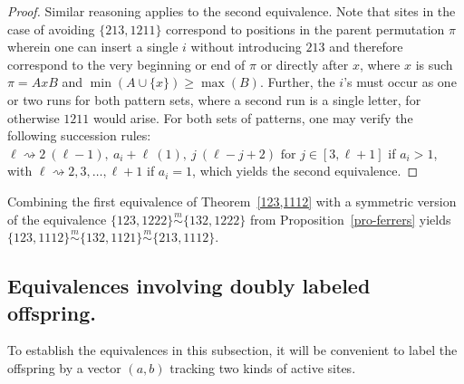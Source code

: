 \documentclass[11pt]{amsart}
\theoremstyle{plain}
\theoremstyle{definition}
\newcommand{\msim}{\stackrel{m}{\sim}}
\begin{document}
\begin{proof}
Similar reasoning applies to the second equivalence.  Note that sites in the case of avoiding
$\{213,1211\}$ correspond to positions  in the parent permutation $\pi$ wherein one can insert a
single $i$ without introducing $213$ and therefore correspond to the very beginning or end of $\pi$
or directly after $x$, where $x$ is such $\pi=AxB$ and $\min(A\cup\{x\}) \geq \max(B)$.  Further, the
$i$'s must occur as one or two runs for both pattern sets, where a second run is a single letter, for
otherwise $1211$ would arise.  For both sets of patterns, one may verify the following succession
rules:  $\ell \rightsquigarrow 2~(\ell-1),~a_i+\ell~(1),~j~(\ell-j+2) \text{ for } j \in [3,\ell+1]$
if $a_i>1$, with $\ell\rightsquigarrow 2,3,\ldots, \ell+1$ if $a_i=1$, which yields the second
equivalence.
\end{proof}

Combining the first equivalence of Theorem~\ref{123,1112} with a symmetric version of the
equivalence $\{123,1222\}\msim\{132,1222\}$ from Proposition~\ref{pro-ferrers} yields
$\{123,1112\}\msim\{132,1121\}\msim\{213,1112\}$.

\subsection{Equivalences involving doubly labeled offspring.}

To establish the equivalences in this subsection, it will be convenient to label the offspring by a
vector $(a,b)$ tracking two kinds of active sites.
\end{document}
